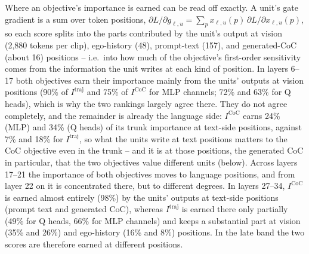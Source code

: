 Where an objective's importance is earned can be read off exactly. A unit's gate gradient is a sum over token positions, $\partial L/\partial g_{\ell,u}=\sum_p x_{\ell,u}(p)\,\partial L/\partial x_{\ell,u}(p)$, so each score splits into the parts contributed by the unit's output at vision (2{,}880 tokens per clip), ego-history (48), prompt-text (157), and generated-CoC (about 16) positions -- i.e.\ into how much of the objective's first-order sensitivity comes from the information the unit writes at each kind of position. In layers 6--17 both objectives earn their importance mainly from the units' outputs at vision positions (90\% of $I^{\mathrm{traj}}$ and 75\% of $I^{\mathrm{CoC}}$ for MLP channels; 72\% and 63\% for Q heads), which is why the two rankings largely agree there. They do not agree completely, and the remainder is already the language side: $I^{\mathrm{CoC}}$ earns 24\% (MLP) and 34\% (Q heads) of its trunk importance at text-side positions, against 7\% and 18\% for $I^{\mathrm{traj}}$, so what the units write at text positions matters to the CoC objective even in the trunk -- and it is at those positions, the generated CoC in particular, that the two objectives value different units (below). Across layers 17--21 the importance of both objectives moves to language positions, and from layer 22 on it is concentrated there, but to different degrees. In layers 27--34, $I^{\mathrm{CoC}}$ is earned almost entirely (98\%) by the units' outputs at text-side positions (prompt text and generated CoC), whereas $I^{\mathrm{traj}}$ is earned there only partially (49\% for Q heads, 66\% for MLP channels) and keeps a substantial part at vision (35\% and 26\%) and ego-history (16\% and 8\%) positions. In the late band the two scores are therefore earned at different positions.

